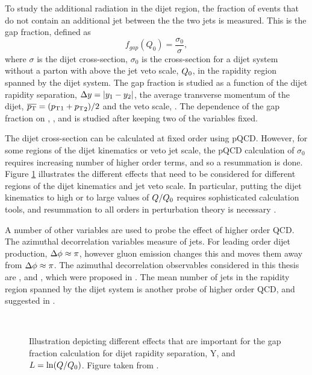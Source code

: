 To study the additional radiation in the dijet region, the fraction of events that do not contain an additional jet between the the two jets is measured.
This is the gap fraction, defined as
\begin{equation}
f_{gap}(Q_{0}) = \frac{\sigma_{0}}{\sigma},
\label{Theory:GapFraction}
\end{equation}
where $\sigma$ is the dijet cross-section,  $\sigma_{0}$ is the cross-section for a dijet system without a parton with \pt{} above the jet veto scale, $\mbox{$Q_0$}{}$, in the rapidity region spanned by the dijet system.
The gap fraction is studied as a function of the dijet rapidity separation, $\mbox{$\Delta y$}{}=|y_{1}-y_{2}|$, the average transverse momentum of the dijet, $\mbox{$\overline{p_{\rm T}}$}{}=(\mbox{$p_{\rm T}$}{}_{1}+\mbox{$p_{\rm T}$}_{2})/2$ and the veto scale, \qz{}.
The dependence of the gap fraction on \dy{}, \ptb{}, and \qz{} is studied after keeping two of the variables fixed.

The dijet cross-section can be calculated at fixed order using pQCD.
However, for some regions of the dijet kinematics or veto jet scale, the pQCD calculation of $\sigma_{0}$ requires increasing number of higher order terms, and so a resummation is done.
Figure \ref{Theory:KineRange} illustrates the different effects that need to be considered for different regions of the dijet kinematics and jet veto scale.
In particular, putting the dijet kinematics to high \dy{} or to large values of $Q/\mbox{$Q_0$}{}$ requires sophisticated calculation tools, and resummation to all orders in perturbation theory is necessary \cite{ref:Jeff3,ref:HEJ1}.

A number of other variables are used to probe the effect of higher order QCD.
The azimuthal decorrelation variables measure \dphi{} of jets.
For leading order dijet production, $\mbox{$\Delta{\rm \phi}$}{}\approx{}\pi$, however gluon emission changes this and moves them away from $\mbox{$\Delta{\rm \phi}$}{}\approx{}\pi$.
The azimuthal decorrelation observables considered in this thesis are \dphiDist{}, \mean{\cosdphi{}} and \mean{\costwodphi{}}, which were proposed in \cite{ref:BFKL,ref:BFKL_cos,ref:BFKL_dPhi,ref:Anderson1}.  
The mean number of jets in the rapidity region spanned by the dijet system is another probe of higher order QCD, and suggested in \cite{ref:Andersen2}.



\begin{figure}
\centering
\mbox{
}
\caption[Illustration of the different effects on the gap fraction for a range of phase space ]{
Illustration depicting different effects that are important for the gap fraction calculation for dijet rapidity separation, Y, and $L=\ln(Q/\mbox{$Q_0$}{})$.
Figure taken from \cite{ref:Forshaw_Veto}.
\label{Theory:KineRange}}
\end{figure}





